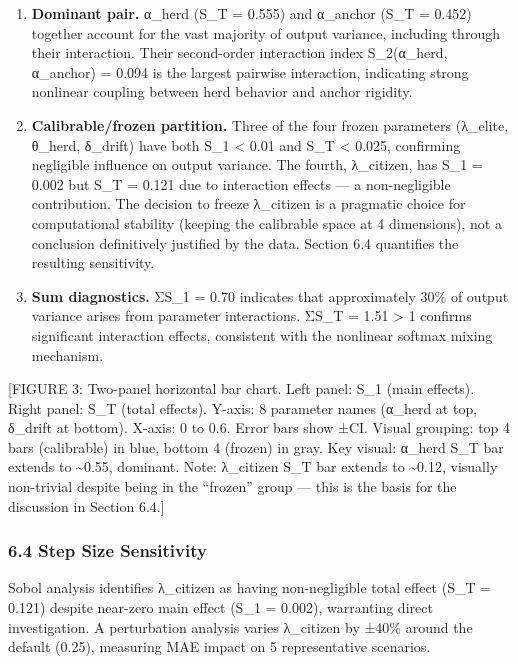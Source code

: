 \documentclass[
]{article}
\begin{document}
\begin{enumerate}
\def\labelenumi{\arabic{enumi}.}
\item
  \textbf{Dominant pair.} α\_herd (S\_T = 0.555) and α\_anchor (S\_T =
  0.452) together account for the vast majority of output variance,
  including through their interaction. Their second-order interaction
  index S\_2(α\_herd, α\_anchor) = 0.094 is the largest pairwise
  interaction, indicating strong nonlinear coupling between herd
  behavior and anchor rigidity.
\item
  \textbf{Calibrable/frozen partition.} Three of the four frozen
  parameters (λ\_elite, θ\_herd, δ\_drift) have both S\_1 \textless{}
  0.01 and S\_T \textless{} 0.025, confirming negligible influence on
  output variance. The fourth, λ\_citizen, has S\_1 = 0.002 but S\_T =
  0.121 due to interaction effects --- a non-negligible contribution.
  The decision to freeze λ\_citizen is a pragmatic choice for
  computational stability (keeping the calibrable space at 4
  dimensions), not a conclusion definitively justified by the data.
  Section 6.4 quantifies the resulting sensitivity.
\item
  \textbf{Sum diagnostics.} ΣS\_1 = 0.70 indicates that approximately
  30\% of output variance arises from parameter interactions. ΣS\_T =
  1.51 \textgreater{} 1 confirms significant interaction effects,
  consistent with the nonlinear softmax mixing mechanism.
\end{enumerate}

{[}FIGURE 3: Two-panel horizontal bar chart. Left panel: S\_1 (main
effects). Right panel: S\_T (total effects). Y-axis: 8 parameter names
(α\_herd at top, δ\_drift at bottom). X-axis: 0 to 0.6. Error bars show
±CI. Visual grouping: top 4 bars (calibrable) in blue, bottom 4 (frozen)
in gray. Key visual: α\_herd S\_T bar extends to \textasciitilde0.55,
dominant. Note: λ\_citizen S\_T bar extends to \textasciitilde0.12,
visually non-trivial despite being in the ``frozen'' group --- this is
the basis for the discussion in Section 6.4.{]}

\subsubsection{6.4 Step Size Sensitivity}\label{step-size-sensitivity}

Sobol analysis identifies λ\_citizen as having non-negligible total
effect (S\_T = 0.121) despite near-zero main effect (S\_1 = 0.002),
warranting direct investigation. A perturbation analysis varies
λ\_citizen by ±40\% around the default (0.25), measuring MAE impact on 5
representative scenarios.
\end{document}
